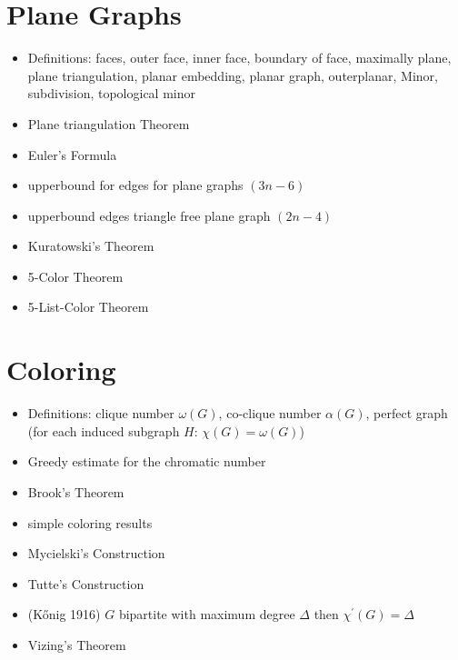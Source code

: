 \documentclass[a4paper]{article}
\begin{document}
\section{Plane Graphs}                                           
\begin{itemize}
    \item Definitions: faces, outer face, inner face, boundary of face,
    maximally plane, plane triangulation, planar embedding, planar graph,
    outerplanar, Minor, subdivision, topological minor

    \item Plane triangulation Theorem
    \item Euler's Formula 
    \item upperbound for edges for plane graphs $(3n - 6)$
    \item upperbound edges triangle free plane graph $(2n - 4)$
    \item Kuratowski's Theorem 
    \item 5-Color Theorem
    \item 5-List-Color Theorem
\end{itemize}


\section{Coloring}                                               
\begin{itemize}
    \item Definitions: clique number $\omega(G)$, co-clique number $\alpha(G)$,
    perfect graph (for each induced subgraph $H$: $\chi(G) = \omega(G)$)
    \item Greedy estimate for the chromatic number  
    \item Brook's Theorem 
    \item simple coloring results
    \item Mycielski's Construction
    \item Tutte's Construction
    \item (K\H{o}nig 1916) $ G $ bipartite with maximum degree $\Delta$ then $\chi^\prime(G) = \Delta$
    \item Vizing's Theorem
\end{itemize}
\end{document}
